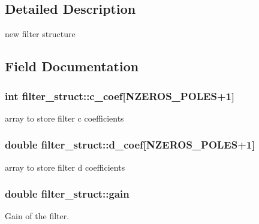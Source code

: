 \subsection{Detailed Description}
new filter structure 

\subsection{Field Documentation}
\hypertarget{structfilter__struct_a85747cbd60c344fc5e1e7ce15025b127}{}
\subsubsection[{c\+\_\+coef}]{\setlength{\rightskip}{0pt plus 5cm}int filter\+\_\+struct\+::c\+\_\+coef\mbox{[}{\bf N\+Z\+E\+R\+O\+S\+\_\+\+P\+O\+L\+E\+S}+1\mbox{]}}\label{structfilter__struct_a85747cbd60c344fc5e1e7ce15025b127}


array to store filter \textquotesingle{}c\textquotesingle{} coefficients 

\hypertarget{structfilter__struct_a96ca838138c74e416c59b6f35b7b965c}{}
\subsubsection[{d\+\_\+coef}]{\setlength{\rightskip}{0pt plus 5cm}double filter\+\_\+struct\+::d\+\_\+coef\mbox{[}{\bf N\+Z\+E\+R\+O\+S\+\_\+\+P\+O\+L\+E\+S}+1\mbox{]}}\label{structfilter__struct_a96ca838138c74e416c59b6f35b7b965c}


array to store filter \textquotesingle{}d\textquotesingle{} coefficients 

\hypertarget{structfilter__struct_ab8686688a862499e0cbb431206f6536d}{}
\subsubsection[{gain}]{\setlength{\rightskip}{0pt plus 5cm}double filter\+\_\+struct\+::gain}\label{structfilter__struct_ab8686688a862499e0cbb431206f6536d}


Gain of the filter. 

\hypertarget{structfilter__struct_a2e543e657138b4849b87c35ad84e6cf4}{}
